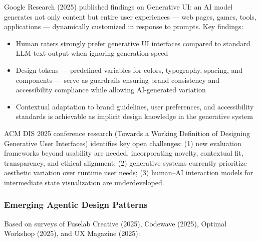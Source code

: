 \documentclass[11pt,letterpaper]{article}
\begin{document}
Google Research (2025) published findings on Generative UI: an AI model generates not only content but entire user experiences --- web pages, games, tools, applications --- dynamically customized in response to prompts. Key findings:

\begin{itemize}[itemsep=0.3em]
  \item Human raters strongly prefer generative UI interfaces compared to standard LLM text output when ignoring generation speed
  \item Design tokens --- predefined variables for colors, typography, spacing, and components --- serve as guardrails ensuring brand consistency and accessibility compliance while allowing AI-generated variation
  \item Contextual adaptation to brand guidelines, user preferences, and accessibility standards is achievable as implicit design knowledge in the generative system
\end{itemize}

ACM DIS 2025 conference research (Towards a Working Definition of Designing Generative User Interfaces) identifies key open challenges: (1) new evaluation frameworks beyond usability are needed, incorporating novelty, contextual fit, transparency, and ethical alignment; (2) generative systems currently prioritize aesthetic variation over runtime user needs; (3) human--AI interaction models for intermediate state visualization are underdeveloped.

\subsubsection{Emerging Agentic Design Patterns}

Based on surveys of Fuselab Creative (2025), Codewave (2025), Optimal Workshop (2025), and UX Magazine (2025):
\end{document}
